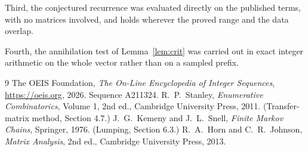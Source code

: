 \documentclass[11pt,a4paper]{article}
\theoremstyle{plain}
\theoremstyle{definition}
\begin{document}
Third, the conjectured recurrence was evaluated directly on the published terms, with no
matrices involved, and holds wherever the proved range and the data overlap.

Fourth, the annihilation test of Lemma~\ref{lem:crit} was carried out in exact integer
arithmetic on the whole vector rather than on a sampled prefix.

\begin{thebibliography}{9}
 The OEIS Foundation, \emph{The On-Line Encyclopedia of Integer
Sequences}, \url{https://oeis.org}, 2026. Sequence A211324.
 R.~P.~Stanley, \emph{Enumerative Combinatorics}, Volume 1, 2nd ed.,
Cambridge University Press, 2011. (Transfer-matrix method, Section 4.7.)
 J.~G.~Kemeny and J.~L.~Snell, \emph{Finite Markov Chains}, Springer, 1976.
(Lumping, Section 6.3.)
 R.~A.~Horn and C.~R.~Johnson, \emph{Matrix Analysis}, 2nd ed., Cambridge
University Press, 2013.
\end{thebibliography}
\end{document}
